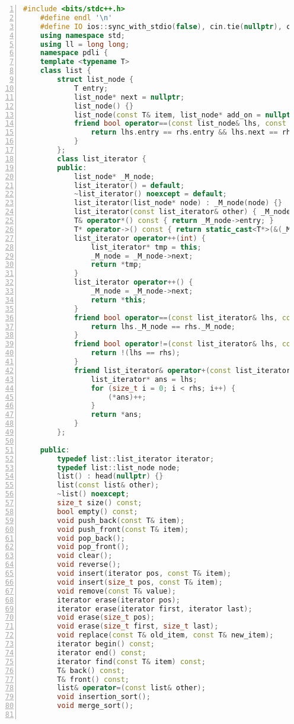 \documentclass{article}
\begin{document}
\begin{lstlisting}[xleftmargin = 2em,xrightmargin = 2em, aboveskip = 0.5em, numbers = left, language = C++]
    #include <bits/stdc++.h>
    #define endl '\n'
    #define IO ios::sync_with_stdio(false), cin.tie(nullptr), cout.tie(nullptr)
    using namespace std;
    using ll = long long;
    namespace pdli {
    template <typename T>
    class list {
        struct list_node {
            T entry;
            list_node* next = nullptr;
            list_node() {}
            list_node(const T& item, list_node* add_on = nullptr) : entry(item), next(add_on) {}
            friend bool operator==(const list_node& lhs, const list_node& rhs) {
                return lhs.entry == rhs.entry && lhs.next == rhs.next;
            }
        };
        class list_iterator {
        public:
            list_node* _M_node;
            list_iterator() = default;
            ~list_iterator() noexcept = default;
            list_iterator(list_node* node) : _M_node(node) {}
            list_iterator(const list_iterator& other) { _M_node = other._M_node; }
            T& operator*() const { return _M_node->entry; }
            T* operator->() const { return static_cast<T*>(&(_M_node->entry)); }
            list_iterator operator++(int) {
                list_iterator* tmp = this;
                _M_node = _M_node->next;
                return *tmp;
            }
            list_iterator operator++() {
                _M_node = _M_node->next;
                return *this;
            }
            friend bool operator==(const list_iterator& lhs, const list_iterator& rhs) {
                return lhs._M_node == rhs._M_node;
            }
            friend bool operator!=(const list_iterator& lhs, const list_iterator& rhs) {
                return !(lhs == rhs);
            }
            friend list_iterator& operator+(const list_iterator& lhs, const size_t& rhs) {
                list_iterator* ans = lhs;
                for (size_t i = 0; i < rhs; i++) {
                    (*ans)++;
                }
                return *ans;
            }
        };

    public:
        typedef list::list_iterator iterator;
        typedef list::list_node node;
        list() : head(nullptr) {}
        list(const list& other);
        ~list() noexcept;
        size_t size() const;
        bool empty() const;
        void push_back(const T& item);
        void push_front(const T& item);
        void pop_back();
        void pop_front();
        void clear();
        void reverse();
        void insert(iterator pos, const T& item);
        void insert(size_t pos, const T& item);
        void remove(const T& value);
        iterator erase(iterator pos);
        iterator erase(iterator first, iterator last);
        void erase(size_t pos);
        void erase(size_t first, size_t last);
        void replace(const T& old_item, const T& new_item);
        iterator begin() const;
        iterator end() const;
        iterator find(const T& item) const;
        T& back() const;
        T& front() const;
        list& operator=(const list& other);
        void insertion_sort();
        void merge_sort();


\end{lstlisting}
\end{document}

